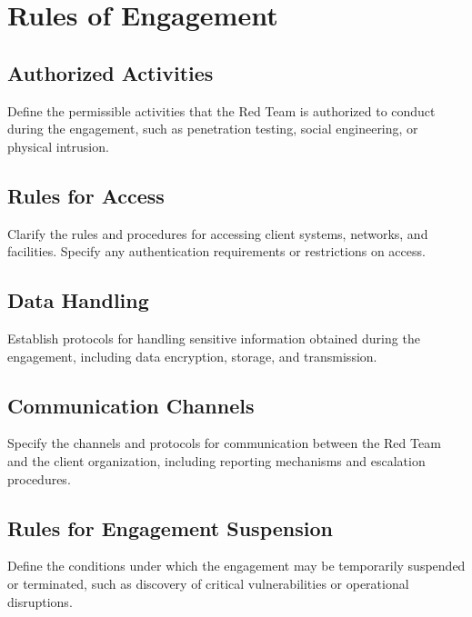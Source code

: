 \section*{Rules of Engagement}
  \subsection*{Authorized Activities}
        Define the permissible activities that the Red Team is authorized to conduct during the engagement, such as penetration testing, social engineering, or physical intrusion.
 \subsection*{Rules for Access}
        Clarify the rules and procedures for accessing client systems, networks, and facilities. Specify any authentication requirements or restrictions on access.
 \subsection*{   Data Handling}
        Establish protocols for handling sensitive information obtained during the engagement, including data encryption, storage, and transmission.
 \subsection*{   Communication Channels}
        Specify the channels and protocols for communication between the Red Team and the client organization, including reporting mechanisms and escalation procedures.
 \subsection*{   Rules for Engagement Suspension}
        Define the conditions under which the engagement may be temporarily suspended or terminated, such as discovery of critical vulnerabilities or operational disruptions.
